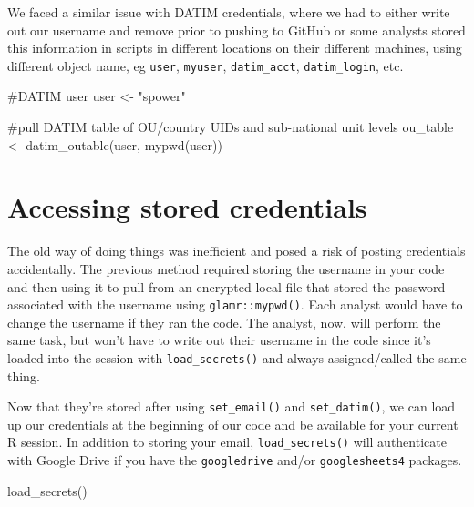 \documentclass[
  letterpaper,
  DIV=11,
  numbers=noendperiod]{scrreprt}
\newenvironment{Shaded}{\begin{snugshade}}{\end{snugshade}}
\newcommand{\CommentTok}[1]{\textcolor[rgb]{0.37,0.37,0.37}{#1}}
\newcommand{\FunctionTok}[1]{\textcolor[rgb]{0.28,0.35,0.67}{#1}}
\newcommand{\NormalTok}[1]{\textcolor[rgb]{0.00,0.23,0.31}{#1}}
\newcommand{\OtherTok}[1]{\textcolor[rgb]{0.00,0.23,0.31}{#1}}
\newcommand{\StringTok}[1]{\textcolor[rgb]{0.13,0.47,0.30}{#1}}
\begin{document}
We faced a similar issue with DATIM credentials, where we had to either
write out our username and remove prior to pushing to GitHub or some
analysts stored this information in scripts in different locations on
their different machines, using different object name, eg \texttt{user},
\texttt{myuser}, \texttt{datim\_acct}, \texttt{datim\_login}, etc.

\begin{Shaded}
\begin{Highlighting}[]
\CommentTok{\#DATIM user}
\NormalTok{  user }\OtherTok{\textless{}{-}} \StringTok{"spower"}

\CommentTok{\#pull DATIM table of OU/country UIDs and sub{-}national unit levels}
\NormalTok{  ou\_table }\OtherTok{\textless{}{-}} \FunctionTok{datim\_outable}\NormalTok{(user, }\FunctionTok{mypwd}\NormalTok{(user))}
\end{Highlighting}
\end{Shaded}

\hypertarget{accessing-stored-credentials}{%
\section{Accessing stored
credentials}\label{accessing-stored-credentials}}

The old way of doing things was inefficient and posed a risk of posting
credentials accidentally. The previous method required storing the
username in your code and then using it to pull from an encrypted local
file that stored the password associated with the username using
\texttt{glamr::mypwd()}. Each analyst would have to change the username
if they ran the code. The analyst, now, will perform the same task, but
won't have to write out their username in the code since it's loaded
into the session with \texttt{load\_secrets()} and always
assigned/called the same thing.

Now that they're stored after using \texttt{set\_email()} and
\texttt{set\_datim()}, we can load up our credentials at the beginning
of our code and be available for your current R session. In addition to
storing your email, \texttt{load\_secrets()} will authenticate with
Google Drive if you have the \texttt{googledrive} and/or
\texttt{googlesheets4} packages.

\begin{Shaded}
\begin{Highlighting}[]
\FunctionTok{load\_secrets}\NormalTok{()}
\end{Highlighting}
\end{Shaded}
\end{document}
